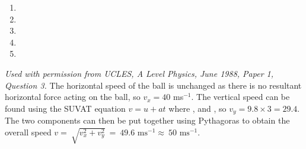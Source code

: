 

\begin{problem}[A1988PIQ3l]
{ 
\begin{enumerate}
	\item {}
	\item  {}
	\item  {}\correct
	\item  {}
	\item  {}
\end{enumerate}
}
{\textit{Used with permission from UCLES, A Level Physics, June 1988, Paper 1, Question 3.}}
{ The horizontal speed of the ball is unchanged as there is no resultant horizontal force acting on the ball, so $v_{x} = 40$ ms$^{-1}$. The vertical speed can be found using the SUVAT equation $v = u + at$ where ,  and , so $v_{y} = 9.8 \times 3 = 29.4$. The two components can then be put together using Pythagoras to obtain the overall speed $v =~\sqrt{v_{x}^{2} + v_{y}^{2}}~=~49.6\textrm{ ms}^{-1} \approx~50\textrm{ ms}^{-1}$.
}
\end{problem}